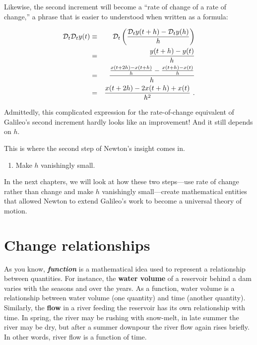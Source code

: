 \documentclass[
  letterpaper,
  DIV=11,
  numbers=noendperiod,
  oneside]{scrreprt}
\providecommand{\tightlist}{%
  \setlength{\itemsep}{0pt}\setlength{\parskip}{0pt}}
\begin{document}
Likewise, the second increment will become a ``rate of change of a rate
of change,'' a phrase that is easier to understood when written as a
formula:


\begin{eqnarray}
{\cal D}_t {\cal D}_t y(t)  &\equiv&   {\cal D}_t \left(\strut \frac{{\cal D}_t y(t+h) - {\cal D}_t y(h)}{h}\right) \\
&=& \frac{y(t+h) - y(t)}{h} \\
&=& \frac{\frac{x(t+2h) - x(t+h)}{h}- \frac{x(t+h) - x(t)}{h}}{h}\\
&=& \frac{x(t+2h) - 2 x(t+h) + x(t)}{h^2}\ .
\end{eqnarray}

Admittedly, this complicated expression for the rate-of-change
equivalent of Galileo's second increment hardly looks like an
improvement! And it still depends on \(h\).

This is where the second step of Newton's insight comes in.

\begin{enumerate}
\def\labelenumi{\arabic{enumi}.}
\setcounter{enumi}{1}
\tightlist
\item
  Make \(h\) vanishingly small.
\end{enumerate}

In the next chapters, we will look at how these two steps---use rate of
change rather than change and make \(h\) vanishingly small---create
mathematical entities that allowed Newton to extend Galileo's work to
become a universal theory of motion.

\hypertarget{change-relationships}{%
\section{Change relationships}\label{change-relationships}}

As you know, \textbf{\emph{function}} is a mathematical idea used to
represent a relationship between quantities. For instance, the
\textbf{water volume} of a reservoir behind a dam varies with the
seasons and over the years. As a function, water volume is a
relationship between water volume (one quantity) and time (another
quantity). Similarly, the \textbf{flow} in a river feeding the reservoir
has its own relationship with time. In spring, the river may be rushing
with snow-melt, in late summer the river may be dry, but after a summer
downpour the river flow again rises briefly. In other words, river flow
is a function of time.
\end{document}
